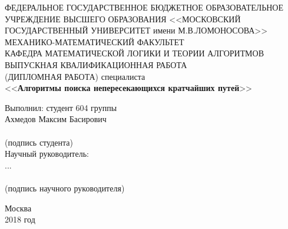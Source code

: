 \begin{center} 

ФЕДЕРАЛЬНОЕ ГОСУДАРСТВЕННОЕ БЮДЖЕТНОЕ ОБРАЗОВАТЕЛЬНОЕ УЧРЕЖДЕНИЕ ВЫСШЕГО ОБРАЗОВАНИЯ <<МОСКОВСКИЙ ГОСУДАРСТВЕННЫЙ УНИВЕРСИТЕТ имени М.В.ЛОМОНОСОВА>>\\[0.7cm]

МЕХАНИКО-МАТЕМАТИЧЕСКИЙ ФАКУЛЬТЕТ\\[0.7cm]

КАФЕДРА МАТЕМАТИЧЕСКОЙ ЛОГИКИ И ТЕОРИИ АЛГОРИТМОВ\\[3cm]

ВЫПУСКНАЯ КВАЛИФИКАЦИОННАЯ РАБОТА\\
(ДИПЛОМНАЯ РАБОТА) специалиста\\[0.7cm]

\large <<\textbf{Алгоритмы поиска непересекающихся кратчайших путей}>>\\[3.7cm]

\end{center} 

\begin{flushright}
Выполнил: студент 604 группы\\
Ахмедов Максим Басирович\\[0.5cm]

\underline{\hspace{6cm}}\\
(подпись студента)\\[1cm]

Научный руководитель:\\
...\\

\underline{\hspace{6cm}}\\
(подпись научного руководителя)\

\end{flushright}


\vfill 

\begin{center} 
Москва\\
2018 год
\end{center} 

\thispagestyle{empty}
